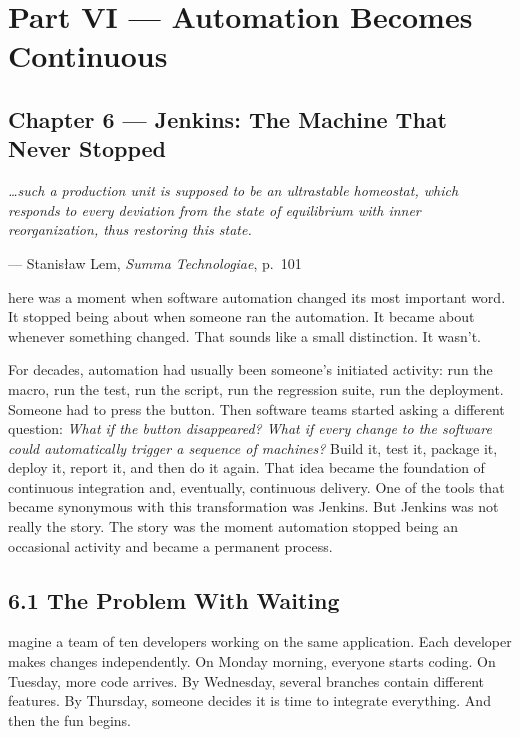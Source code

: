 \documentclass[11pt, a4paper, openany]{book}
\newcommand{\initialcap}[1]{{\fontfamily{lmss}\selectfont\huge\textbf{#1}}}
\providecommand{\epigraphlem}[2]{%
  \begin{flushright}\begin{minipage}{0.72\textwidth}\raggedleft
  \itshape #1\par\vspace{0.4em}\normalfont\small --- #2
  \end{minipage}\end{flushright}\vspace{1.2em}}
\begin{document}
\mainmatter

\chapter*{Part VI --- Automation Becomes Continuous}

\section*{Chapter 6 --- Jenkins: The Machine That Never Stopped}

\epigraphlem{\dots{}such a production unit is supposed to be an ultrastable homeostat, which responds to every deviation from the state of equilibrium with inner reorganization, thus restoring this state.}{Stanisław Lem, \textit{Summa Technologiae}, p.~101}


\noindent \initialcap{T}here was a moment when software automation changed its most important word. It stopped being about when someone ran the automation. It became about whenever something changed. That sounds like a small distinction. It wasn't.

\noindent For decades, automation had usually been someone's initiated activity: run the macro, run the test, run the script, run the regression suite, run the deployment. Someone had to press the button. Then software teams started asking a different question: \textit{What if the button disappeared? What if every change to the software could automatically trigger a sequence of machines?} Build it, test it, package it, deploy it, report it, and then do it again. That idea became the foundation of continuous integration and, eventually, continuous delivery. One of the tools that became synonymous with this transformation was Jenkins. But Jenkins was not really the story. The story was the moment automation stopped being an occasional activity and became a permanent process.

\section{6.1 The Problem With Waiting}
\noindent \initialcap{I}magine a team of ten developers working on the same application. Each developer makes changes independently. On Monday morning, everyone starts coding. On Tuesday, more code arrives. By Wednesday, several branches contain different features. By Thursday, someone decides it is time to integrate everything. And then the fun begins.
\end{document}
